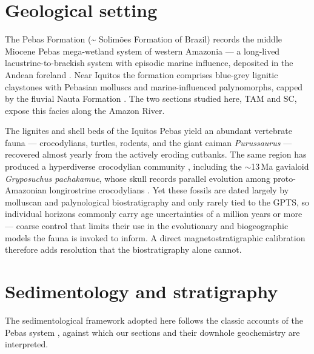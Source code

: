 \documentclass[11pt]{article}
\begin{document}
\section{Geological setting}
The Pebas Formation (\textasciitilde
Solim\~oes Formation of Brazil) records the middle Miocene Pebas mega-wetland
system of western Amazonia --- a long-lived lacustrine-to-brackish system with
episodic marine influence, deposited in the Andean foreland
\citep{Wesselingh2006,Hoorn2010,Hoorn2010ch}. Near Iquitos the formation comprises
blue-grey lignitic claystones with Pebasian molluscs and marine-influenced
palynomorphs, capped by the fluvial Nauta Formation \citep{Rebata2006}. The two
sections studied here, TAM and SC, expose this facies along the Amazon River.

The lignites and shell beds of the Iquitos Pebas yield an abundant vertebrate
fauna --- crocodylians, turtles, rodents, and the giant caiman \textit{Purussaurus}
--- recovered almost yearly from the actively eroding cutbanks. The same region has
produced a hyperdiverse crocodylian community \citep{SalasGismondi2015}, including
the $\sim$13\,Ma gavialoid \textit{Gryposuchus pachakamue}, whose skull records
parallel evolution among proto-Amazonian longirostrine crocodylians
\citep{SalasGismondi2016}. Yet these fossils are dated largely by molluscan and
palynological biostratigraphy and only rarely tied to the GPTS, so individual
horizons commonly carry age uncertainties of a million years or more --- coarse
control that limits their use in the evolutionary and biogeographic models the
fauna is invoked to inform. A direct magnetostratigraphic calibration therefore
adds resolution that the biostratigraphy alone cannot.

\section{Sedimentology and stratigraphy}
The sedimentological framework adopted here follows the classic accounts of the
Pebas system \citep{Hoorn1993,Hoorn1994,Wesselingh2002,Hoorn2010}, against which
our sections and their downhole geochemistry are interpreted.
\end{document}

